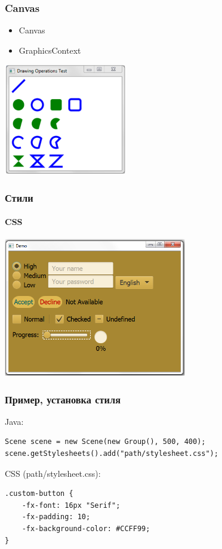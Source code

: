 \documentclass[xetex,mathserif,serif]{beamer}
\begin{document}
	\begin{frame}
		\frametitle{Canvas}
		\begin{itemize}
			\item Canvas
			\item GraphicsContext
		\end{itemize}
		\begin{center}
			\includegraphics[width=0.4\textwidth]{canvas.png}
		\end{center}
	\end{frame}

	\begin{frame}
		\frametitle{Стили}
		\framesubtitle{CSS}
		\begin{center}
			\includegraphics[width=0.6\textwidth]{styles.png}
		\end{center}
	\end{frame}

	\begin{frame}[fragile]
		\frametitle{Пример, установка стиля}
		Java:
		\begin{verbatim}
Scene scene = new Scene(new Group(), 500, 400);
scene.getStylesheets().add("path/stylesheet.css");
		\end{verbatim}
		\vspace{1cm}
		CSS (path/stylesheet.css):
		\begin{verbatim}
.custom-button {
    -fx-font: 16px "Serif";
    -fx-padding: 10;
    -fx-background-color: #CCFF99;
}
		\end{verbatim}
\end{frame}
\end{document}

